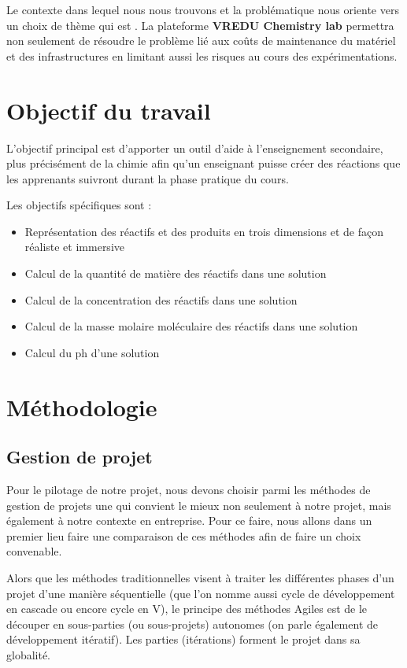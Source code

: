 Le contexte dans lequel nous nous trouvons et la problématique nous oriente vers un
choix de thème qui est \textbf{\og \theme \fg}.
La plateforme \textbf{VREDU Chemistry lab} permettra non seulement de résoudre le problème lié aux coûts de maintenance
du matériel et des infrastructures en limitant aussi les risques au cours des expérimentations.

\section{Objectif du travail}

L’objectif principal est d'apporter un outil d'aide à l'enseignement secondaire, plus précisément de la chimie afin qu'un enseignant puisse créer des réactions que les apprenants suivront durant la phase pratique du cours.

Les objectifs spécifiques sont :

\begin{itemize}
	\item Représentation des réactifs et des produits en trois dimensions et de façon réaliste et immersive
	\item Calcul de la quantité de matière des réactifs dans une solution
	\item Calcul de la concentration des réactifs dans une solution
	\item Calcul de la masse molaire moléculaire des réactifs dans une solution
	\item Calcul du ph d’une solution
\end{itemize}

\section{Méthodologie}

\subsection{Gestion de projet}

Pour le pilotage de notre projet, nous devons choisir parmi les méthodes de gestion de projets une qui convient le mieux non seulement à notre projet, mais également à notre contexte en entreprise.
Pour ce faire, nous allons dans un premier lieu faire une comparaison de ces
méthodes afin de faire un choix convenable.

Alors que les méthodes traditionnelles visent à traiter les différentes phases d’un projet d’une manière séquentielle (que l’on nomme aussi cycle de développement en cascade ou encore cycle
en V), le principe des méthodes Agiles est de le découper en sous-parties (ou sous-projets)
autonomes (on parle également de développement itératif). Les parties (itérations) forment le
projet dans sa globalité.

